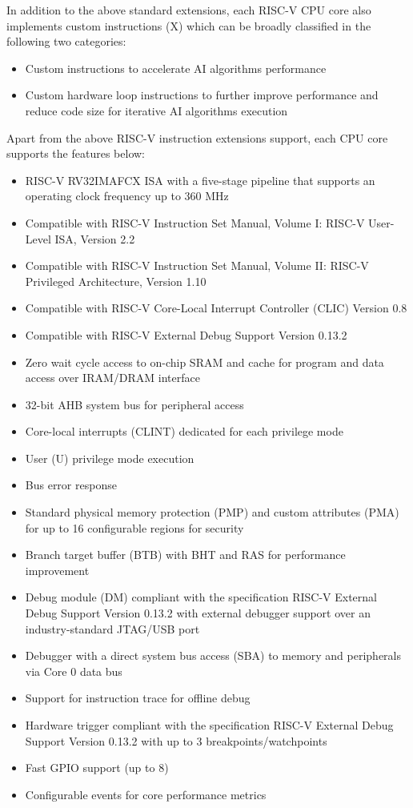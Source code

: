 \documentclass[main\_\_EN.tex]{subfiles}
\begin{document}
In addition to the above standard extensions, each RISC-V CPU core also implements custom instructions (X) which can be broadly classified in the following two categories:
\begin{itemize}
    \item Custom instructions to accelerate AI algorithms performance
    \item Custom hardware loop instructions to further improve performance and reduce code size for iterative AI algorithms execution
\end{itemize}

Apart from the above RISC-V instruction extensions support, each CPU core supports the features below:
\begin{itemize}
    \item RISC-V RV32IMAFCX ISA with a five-stage pipeline that supports an operating clock frequency up to 360 MHz
    \item Compatible with RISC-V Instruction Set Manual, Volume I: RISC-V User-Level ISA, Version 2.2
    \item Compatible with RISC-V Instruction Set Manual, Volume II: RISC-V Privileged Architecture, Version 1.10
    \item Compatible with RISC-V Core-Local Interrupt Controller (CLIC) Version 0.8
    \item Compatible with RISC-V External Debug Support Version 0.13.2
    \item Zero wait cycle access to on-chip SRAM and cache for program and data access over IRAM/DRAM interface
    \item 32-bit AHB system bus for peripheral access
    \item Core-local interrupts (CLINT) dedicated for each privilege mode
    \item User (U) privilege mode execution
    \item Bus error response
    \item Standard physical memory protection (PMP) and custom attributes (PMA) for up to 16 configurable regions for security
    \item Branch target buffer (BTB) with BHT and RAS for performance improvement
    \item Debug module (DM) compliant with the specification RISC-V External Debug Support Version 0.13.2 with external debugger support over an industry-standard JTAG/USB port
    \item Debugger with a direct system bus access (SBA) to memory and peripherals via Core 0 data bus
    \item Support for instruction trace for offline debug
    \item Hardware trigger compliant with the specification RISC-V External Debug Support Version 0.13.2 with up to 3 breakpoints/watchpoints
    \item Fast GPIO support (up to 8)
    \item Configurable events for core performance metrics
\end{itemize}
\end{document}
